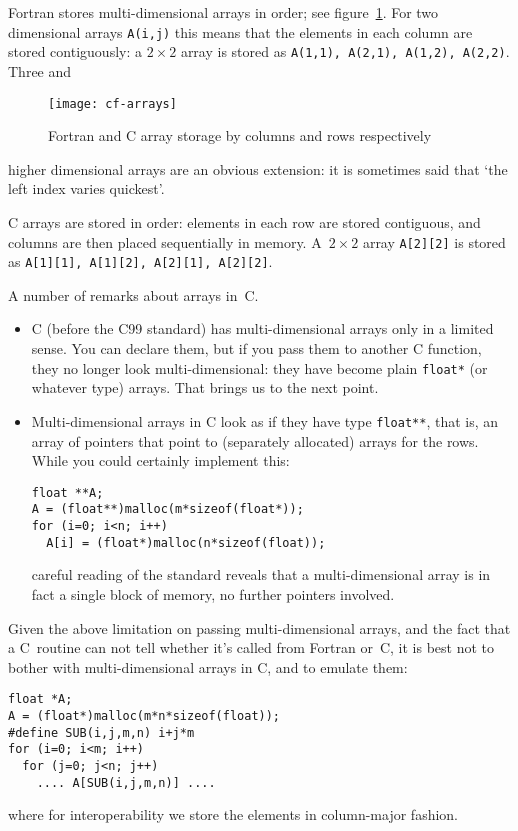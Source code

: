 Fortran stores multi-dimensional arrays in 
order; see figure~\ref{fig:cf-arrays}.
For two dimensional arrays \texttt{A(i,j)} this means that
the elements in each column are stored contiguously: a $2\times2$
array is stored as \texttt{A(1,1), A(2,1), A(1,2), A(2,2)}. Three and
\begin{figure}[ht]
  \texttt{[image: cf-arrays]}
  \caption{Fortran and C array storage by columns and rows respectively}
  \label{fig:cf-arrays}
\end{figure}
higher dimensional arrays are an obvious extension: it is sometimes
said that `the left index varies quickest'.

C arrays are stored in  order: elements in each
row are stored contiguous, and columns are then placed sequentially in
memory. A~$2\times2$ array \texttt{A[2][2]} is stored as
\texttt{A[1][1], A[1][2], A[2][1], A[2][2]}. 

A number of remarks about arrays in~C.
\begin{itemize}
\item C (before the C99 standard) has multi-dimensional arrays only in
  a limited sense. You can declare them, but if you pass them to another
  C function, they no longer look multi-dimensional: they have become
  plain \texttt{float*} (or whatever type) arrays. That brings us to
  the next point.
\item Multi-dimensional arrays in C look as if they have type
  \texttt{float**}, that is, an array of pointers that point to
  (separately allocated) arrays for the rows. While you could
  certainly implement this:
\begin{verbatim}
float **A;
A = (float**)malloc(m*sizeof(float*));
for (i=0; i<n; i++)
  A[i] = (float*)malloc(n*sizeof(float));
\end{verbatim}
  careful reading of the standard reveals that a multi-dimensional
  array is in fact a single block of memory, no further pointers
  involved.
\end{itemize}
Given the above limitation on passing multi-dimensional arrays, and
the fact that a C~routine can not tell whether it's called from
Fortran or~C, it is best not to bother with multi-dimensional arrays
in C, and to emulate them:
\begin{verbatim}
float *A;
A = (float*)malloc(m*n*sizeof(float));
#define SUB(i,j,m,n) i+j*m
for (i=0; i<m; i++)
  for (j=0; j<n; j++)
    .... A[SUB(i,j,m,n)] ....
\end{verbatim}
where for interoperability we store the elements in column-major fashion.


